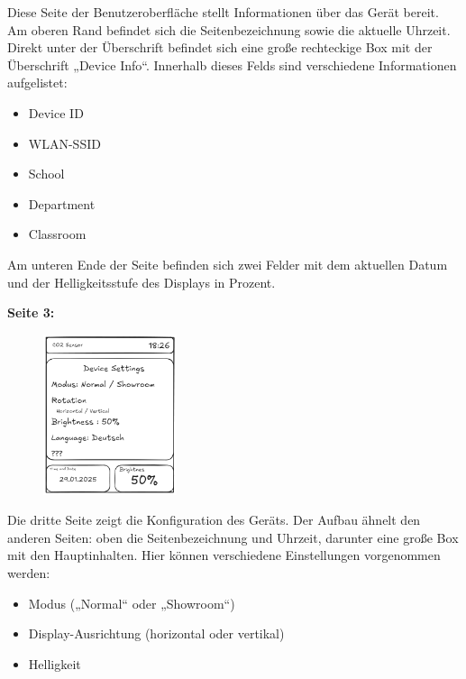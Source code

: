 \begin{inhalt}
Diese Seite der Benutzeroberfläche stellt Informationen über das Gerät bereit. Am oberen Rand befindet sich die Seitenbezeichnung sowie die aktuelle Uhrzeit. Direkt unter der Überschrift befindet sich eine große rechteckige Box mit der Überschrift „Device Info“. Innerhalb dieses Felds sind verschiedene Informationen aufgelistet:
\begin{itemize}
    \item Device ID
    \item WLAN-SSID
    \item School
    \item Department
    \item Classroom
\end{itemize}

Am unteren Ende der Seite befinden sich zwei Felder mit dem aktuellen Datum und der Helligkeitsstufe des Displays in Prozent.

\begin{center}
    \textbf{Seite 3:}
\end{center}

\begin{figure}[!htb]
\centering
\includegraphics[width=0.35\textwidth]{files/Tobias/pics/Skizzen/Screen3_Settings.png}
\caption[Display Interface Skizze (Seite 3)]{}
\label{fig:display_skizze_seite_3}
\end{figure}

Die dritte Seite zeigt die Konfiguration des Geräts. Der Aufbau ähnelt den anderen Seiten: oben die Seitenbezeichnung und Uhrzeit, darunter eine große Box mit den Hauptinhalten. Hier können verschiedene Einstellungen vorgenommen werden:

\begin{itemize}
    \item Modus („Normal“ oder „Showroom“)
    \item Display-Ausrichtung (horizontal oder vertikal)
    \item Helligkeit
\end{itemize}


\end{inhalt}
